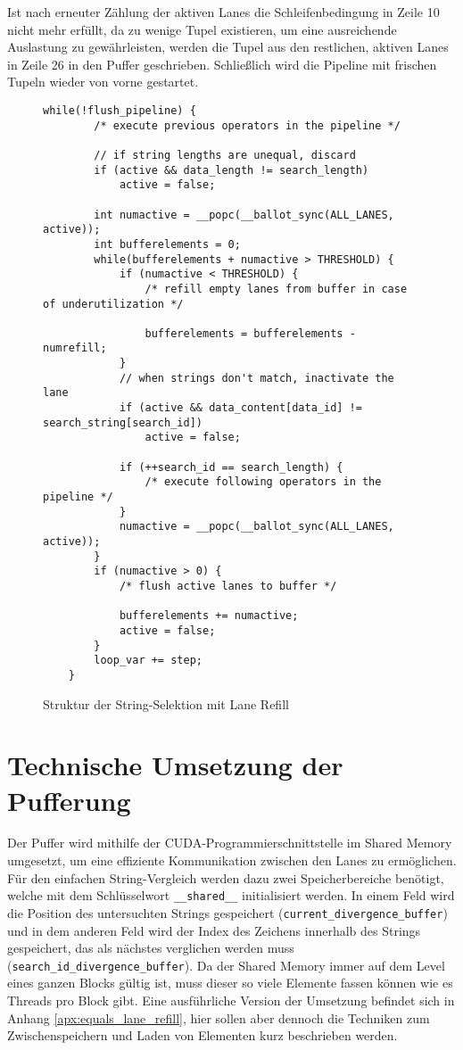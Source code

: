 Ist nach erneuter Zählung der aktiven Lanes die Schleifenbedingung in Zeile 10 nicht mehr erfüllt, da zu wenige Tupel existieren, um eine ausreichende Auslastung zu gewährleisten, werden die Tupel aus den restlichen, aktiven Lanes in Zeile 26 in den Puffer geschrieben.
Schließlich wird die Pipeline mit frischen Tupeln wieder von vorne gestartet.

\newpage

\begin{figure}[ht]
	\begin{lstlisting}[language=MyC++]
	while(!flush_pipeline) {
		/* execute previous operators in the pipeline */
		
		// if string lengths are unequal, discard
		if (active && data_length != search_length)
			active = false;
		
		int numactive = __popc(__ballot_sync(ALL_LANES, active));
		int bufferelements = 0;
		while(bufferelements + numactive > THRESHOLD) {
			if (numactive < THRESHOLD) {
				/* refill empty lanes from buffer in case of underutilization */
				
				bufferelements = bufferelements - numrefill;
			}
			// when strings don't match, inactivate the lane
			if (active && data_content[data_id] != search_string[search_id])
				active = false;
			
			if (++search_id == search_length) {
				/* execute following operators in the pipeline */
			}
			numactive = __popc(__ballot_sync(ALL_LANES, active));
		}
		if (numactive > 0) {
			/* flush active lanes to buffer */
			
			bufferelements += numactive;
			active = false;
		}
		loop_var += step;
	}
	\end{lstlisting}
	\caption{Struktur der String-Selektion mit Lane Refill}
	\label{equals_lane_refill_code}
\end{figure}

\section{Technische Umsetzung der Pufferung}
\label{sec:equals_lane_refill_pufferung}

Der Puffer wird mithilfe der CUDA-Programmierschnittstelle im Shared Memory umgesetzt, um eine effiziente Kommunikation zwischen den Lanes zu ermöglichen.
Für den einfachen String-Vergleich werden dazu zwei Speicherbereiche benötigt, welche mit dem Schlüsselwort \texttt{\_\_shared\_\_} initialisiert werden.
In einem Feld wird die Position des untersuchten Strings gespeichert (\texttt{current\_divergence\_buffer}) und in dem anderen Feld wird der Index des Zeichens innerhalb des Strings gespeichert, das als nächstes verglichen werden muss (\texttt{search\_id\_divergence\_buffer}).
Da der Shared Memory immer auf dem Level eines ganzen Blocks gültig ist, muss dieser so viele Elemente fassen können wie es Threads pro Block gibt.
Eine ausführliche Version der Umsetzung befindet sich in Anhang \ref{apx:equals_lane_refill}, hier sollen aber dennoch die Techniken zum Zwischenspeichern und Laden von Elementen kurz beschrieben werden.

